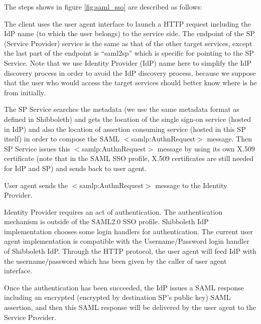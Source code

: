 \documentclass{article}                            %
\begin{document}
The steps shows in figure \ref{fig:saml_sso} are described as follows:

  \begin{list}{.}
  {\setlength{\rightmargin}{\leftmargin}}
    \item The client uses the user agent interface to launch a HTTP request including the IdP name (to which the user belongs) to the service side. The endpoint of the SP (Service Provider) service is the same as that of the other target services, except the last part of the endpoint is ``saml2sp'' which is specific for pointing to the SP Service. Note that we use Identity Provider (IdP) name here to simplify the IdP discovery process in order to avoid the IdP discovery process, because we suppose that the user who would access the target services should better know where is he from initially.

    \item The SP Service searches the metadata (we use the same metadata format as defined in Shibboleth) and gets the location of the single sign-on service (hosted in IdP) and also the location of assertion consuming service (hosted in this SP itself) in order to compose the SAML $<$samlp:AuthnRequest$>$ message. Then SP Service issues this $<$samlp:AuthnRequest$>$ message by using its own X.509 certificate (note that in the SAML SSO profile, X.509 certificates are still needed for IdP and SP) and sends back to user agent.

    \item User agent sends the $<$samlp:AuthnRequest$>$ message to the Identity Provider.

    \item Identity Provider requires an act of authentication. The authentication mechanism is outside of the SAML2.0 SSO profile. Shibboleth IdP implementation chooses some login handlers for authentication. The current user agent implementation is compatible with the Username/Password login handler of Shibboleth IdP. Through the HTTP protocol, the user agent will feed IdP with the username/password which has been given by the caller of user agent interface.

    \item Once the authentication has been succeeded, the IdP issues a SAML response including an encrypted (encrypted by destination SP’s public key) SAML assertion, and then this SAML response will be delivered by the user agent to the Service Provider.


\end{list}
\end{document}
